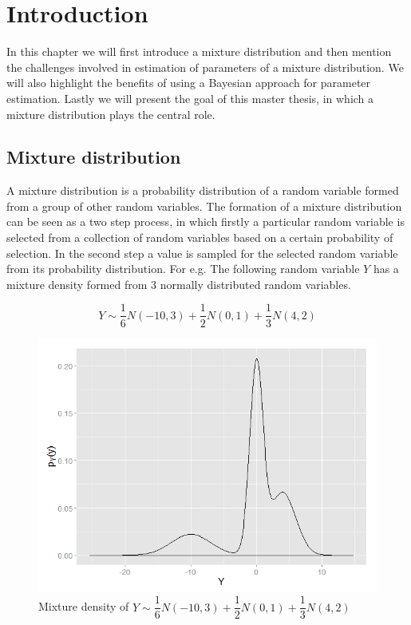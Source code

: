 
\chapter{Introduction}
\label{ch : introduction}

In this chapter we will first introduce a mixture distribution and then mention the challenges involved in estimation of parameters of a mixture distribution. We will also highlight the benefits of using a Bayesian approach for parameter estimation. Lastly we will present the goal of this master thesis, in which a mixture distribution plays the central role.

\section{Mixture distribution}
\label{sec : mixture_distribution}
A mixture distribution is a probability distribution of a random variable formed from a group of other random variables. The formation of a mixture distribution can be seen as a two step process, in which firstly a particular random variable is selected from a collection of random variables based on a certain probability of selection. In the second step a value is sampled for the selected random variable from its probability distribution. For e.g. The following random variable $Y$ has a mixture density formed from 3 normally distributed random variables.

$$Y \sim \dfrac{1}{6}N(-10,3) + \dfrac{1}{2}N(0,1) + \dfrac{1}{3}N(4,2)$$

\begin{figure}
	\centering
	\includegraphics[scale=0.5]{mainmatter/chapter_1_introduction/mixture_density.png}
	\caption{Mixture density of $Y \sim \dfrac{1}{6}N(-10,3) + \dfrac{1}{2}N(0,1) + \dfrac{1}{3}N(4,2)$}
	\label{fig : mixture_density_1}
\end{figure}


